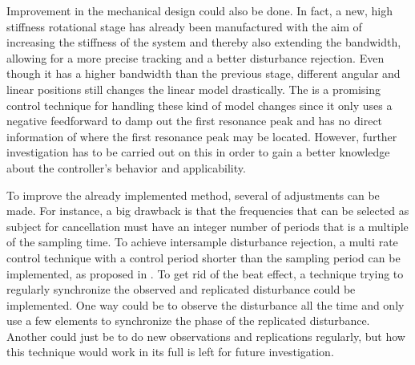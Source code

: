 Improvement in the mechanical design could also be done. In fact, a new, high stiffness rotational stage has already been manufactured with the aim of increasing the stiffness of the system and thereby also extending the bandwidth, allowing for a more precise tracking and a better disturbance rejection. Even though it has a higher bandwidth than the previous stage, different angular and linear positions still changes the linear model drastically. The \abbrIRC is a promising control technique for handling these kind of model changes since it only uses a negative feedforward to damp out the first resonance peak and has no direct information of where the first resonance peak may be located. However, further investigation has to be carried out on this in order to gain a better knowledge about the controller's behavior and applicability.

To improve the already implemented \abbrRFDC method, several of adjustments can be made. For instance, a big drawback is that the frequencies that can be selected as subject for cancellation must have an integer number of periods that is a multiple of the sampling time. To achieve intersample disturbance rejection, a multi rate control technique with a control period shorter than the sampling period can be implemented, as proposed in \citep{fujimoto2009rro}. To get rid of the beat effect, a technique trying to regularly synchronize the observed and replicated disturbance could be implemented. One way could be to observe the disturbance all the time and only use a few elements to synchronize the phase of the replicated disturbance. Another could just be to do new observations and replications regularly, but how this technique would work in its full is left for future investigation.
